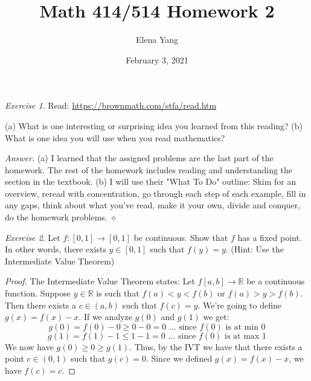\documentclass[12pt,oneside]{amsart}
\title{Math 414/514 Homework 2}
\author{Elena Yang}
\date{February 3, 2021}
\theoremstyle{definition}
\theoremstyle{remark}
\newtheorem{exer}{Exercise}
\numberwithin{equation}{exer}
\newenvironment{answer}{\bigskip\noindent\emph{Answer.}}{\hfill$\diamond$\newline}
\begin{document}
\maketitle

\begin{exer}
Read: \url{https://brownmath.com/stfa/read.htm}

(a) What is one interesting or surprising idea you learned from this reading?
(b) What is one idea you will use when you read mathematics?
\end{exer}
\begin{answer}
(a) I learned that the assigned problems are the last part of the homework. The rest of the homework includes reading and understanding the section in the textbook. (b) I will use their "What To Do" outline: Skim for an overview, reread with concentration, go through each step of each example, fill in any gaps, think about what you've read, make it your own, divide and conquer, do the homework problems.
\end{answer}

\newpage
\begin{exer}
Let $f:[0,1]\rightarrow [0,1]$ be continuous. Show that $f$ has a fixed point. In other words, there exists $y\in [0,1]$ such that $f(y)=y$. (Hint: Use the Intermediate Value Theorem)
\end{exer}
\begin{proof}
The Intermediate Value Theorem states: Let $f[a,b]\rightarrow \mathbb{R}$ be a continuous function. Suppose $y \in \mathbb{R}$ is such that $f(a)<y<f(b)$ or $f(a)>y>f(b)$. Then there exists a $c \in (a,b)$ such that $f(c)=y$. We're going to define $g(x)=f(x)-x$. If we analyze $g(0)$ and $g(1)$ we get:
$$g(0)=f(0)-0\geq 0-0=0 \text{ ... since $f(0)$ is at min 0}$$ 
$$g(1)=f(1)-1\leq 1-1=0 \text{ ... since $f(0)$ is at max 1}$$
We now have $g(0) \geq 0 \geq g(1)$. Thus, by the IVT we have that there exists a point $c\in (0,1)$ such that $g(c)=0$. Since we defined $g(x)=f(x)-x$, we have $f(c)=c$.
\end{proof}
\end{document}
